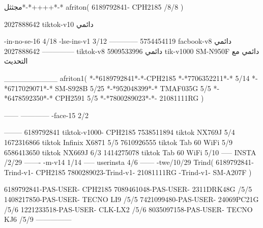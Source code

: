 مجثثل*-*++++*-*
afriton(
6189792841- CPH2185  /8/8
)

2027888642 tiktok-v10
دائمي

-in-no-se-16 4/18
-lse-ins-v1 3/12
------------
5754454119 facbook-v8
دائمي
--------------
2027888642 tiktok-v8
دائمي
5909533996 tik-v1000  SM-N950F
دائمي مع التحديث

__________
afriton1(
*-*6189792841*-*-CPH2185
*-*7706352211*-* 5/14
*-*6717029071*-*  SM-S928B 5/25
*-*952048399*-* TMAF035G 5/5
*-*6478592350*-* CPH2591 5/5
*-*7800289023*-*- 21081111RG \5\7
)


------
------------
-face-15 2/2

--------
6189792841 tiktok-v1000- CPH2185 
7538511894 tiktok NX769J  5/4
1672316866 tiktok Infinix X6871  5/5
7610926555 tiktok Tab 60 WiFi  5/9
6586413650 tiktok NX669J  6/3
1414275078 tiktok Tab 60 WiFi  5/10
-----
 INSTA /2/29
-------
-m-v14 1/14
-----
userinsta 4/6
------
-twe/10/29
Trind(
6189792841-Trind-v1- CPH2185 
7800289023-Trind-v1- 21081111RG \5-Trind-v1- SM-A207F \5\9
)

6189792841-PAS-USER- CPH2185 
7089461048-PAS-USER- 2311DRK48G /5/5
1408217850-PAS-USER- TECNO LI9 /5/5
7421099480-PAS-USER- 24069PC21G /5/6
1221233518-PAS-USER- CLK-LX2 /5/6
8035097158-PAS-USER- TECNO KJ6  /5/9
    ---------------
